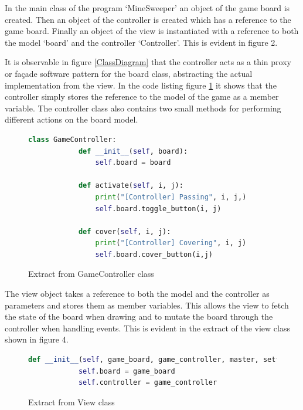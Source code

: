 \documentclass[12pt, a4]{report}
\begin{document}
\par In the main class of the program `MineSweeper' an object of the game board is created. Then an object of the controller is created which has a reference to the game board. Finally an object of the view is instantiated with a reference to both the model `board' and the controller `Controller'. This is evident in figure 2.
\newline
\par It is observable in figure \ref{ClassDiagram} that the controller acts as a thin proxy or façade software pattern for the board class, abstracting the actual implementation from the view. In the code listing figure \ref{code:controller} it shows that the controller simply stores the reference to the model of the game as a member variable. The controller class also contains two small methods for performing different actions on the board model.
\begin{figure}[!h]
	\label{code:controller}
	\begin{lstlisting}[language=python]
		class GameController:
			def __init__(self, board):
				self.board = board
			
			def activate(self, i, j):
				print("[Controller] Passing", i, j,)
				self.board.toggle_button(i, j)
		
			def cover(self, i, j):
				print("[Controller] Covering", i, j)
				self.board.cover_button(i,j)
	\end{lstlisting}
	\caption{Extract from GameController class}
\end{figure}
\newline
\par The view object takes a reference to both the model and the controller as parameters and stores them as member variables. This allows the view to fetch the state of the board when drawing and to mutate the board through the controller when handling events. This is evident in the extract of the view class shown in figure 4.
\begin{figure}[!h]
	\label{view}
	\begin{lstlisting}[language=python]
		def __init__(self, game_board, game_controller, master, settings):
        	self.board = game_board
        	self.controller = game_controller
	\end{lstlisting}
	\caption{Extract from View class}
\end{figure}
\end{document}
